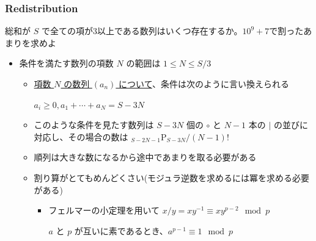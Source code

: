 \documentclass[t, aspectratio=169, dvipdfmx]{beamer}
\newcommand{\perm}[2]{{}_{#1}\mathrm{P}_{#2}}
\begin{document}
\begin{frame}
  \frametitle{Redistribution}
  総和が $S$ で全ての項が3以上である数列はいくつ存在するか。$10^9+7$で割ったあまりを求めよ
  \begin{itemize}
    \item 条件を満たす数列の項数 $N$ の範囲は $1 \leq N \leq S/3$
    \begin{itemize}
      \item \underline{項数 $N$ の数列 $(a_n)$ について}、条件は次のように言い換えられる
      \begin{tcolorbox}
        $a_i \geq 0, a_1+\cdots+a_N=S-3N$
      \end{tcolorbox}
      \item このような条件を見たす数列は $S-3N$ 個の $\circ$ と $N-1$ 本の $|$ の並びに対応し、その場合の数は $\perm{S-2N-1}{S-3N}/(N-1)!$
      \item 順列は大きな数になるから途中であまりを取る必要がある
      \item 割り算がとてもめんどくさい(モジュラ逆数を求めるには冪を求める必要がある)
      \begin{itemize}
        \item フェルマーの小定理を用いて $x/y = xy^{-1} \equiv xy^{p-2} \mod p$
        \begin{mytheorem}[フェルマーの小定理]
          $a$ と $p$ が互いに素であるとき、$a^{p-1} \equiv 1 \mod p$
        \end{mytheorem}
      \end{itemize}
    \end{itemize}
  \end{itemize}
\end{frame}
\end{document}
